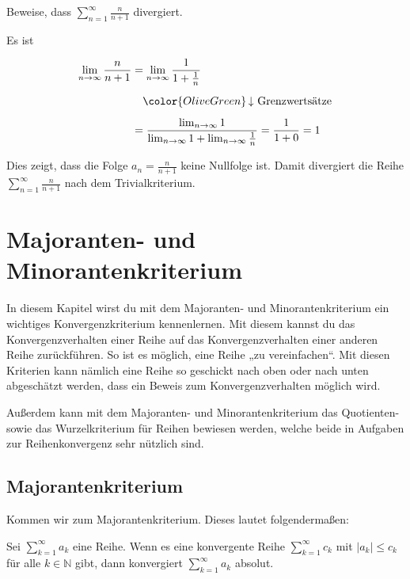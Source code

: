 \documentclass[fontsize=9pt,
               parskip=half-,
               DIV=14,
               listof=chapterentry,
               tocflat]{scrbook}
\begin{document}
\begin{exercise*}
Beweise, dass $\sum _{n=1}^{\infty }{\frac {n}{n+1}}$ divergiert.

\end{exercise*}

\begin{solution*}
Es ist

\begin{align*}
\lim _{n\to \infty }{\frac {n}{n+1}}&=\lim _{n\to \infty }{\frac {1}{1+{\frac {1}{n}}}}\\[0.5em]&\quad {\color {OliveGreen}\left\downarrow \ {\text{Grenzwertsätze}}\right.}\\[0.5em]&={\frac {\lim _{n\to \infty }1}{\lim _{n\to \infty }1+\lim _{n\to \infty }{\frac {1}{n}}}}={\frac {1}{1+0}}=1
\end{align*}

Dies zeigt, dass die Folge $a_{n}={\tfrac {n}{n+1}}$ keine Nullfolge ist. Damit divergiert die Reihe $\sum _{n=1}^{\infty }{\frac {n}{n+1}}$ nach dem Trivialkriterium.

\end{solution*}

\chapter{Majoranten- und Minorantenkriterium}

In diesem Kapitel wirst du mit dem Majoranten- und Minorantenkriterium ein wichtiges Konvergenzkriterium kennenlernen. Mit diesem kannst du das Konvergenzverhalten einer Reihe auf das Konvergenzverhalten einer anderen Reihe zurückführen. So ist es möglich, eine Reihe „zu vereinfachen“. Mit diesen Kriterien kann nämlich eine Reihe so geschickt nach oben oder nach unten abgeschätzt werden, dass ein Beweis zum Konvergenzverhalten möglich wird.

Außerdem kann mit dem Majoranten- und Minorantenkriterium das Quotienten- sowie das Wurzelkriterium für Reihen bewiesen werden, welche beide in Aufgaben zur Reihenkonvergenz sehr nützlich sind.

\section{Majorantenkriterium}

Kommen wir zum Majorantenkriterium. Dieses lautet folgendermaßen:

\begin{theorem*}[Majorantenkriterium]
Sei $\sum _{k=1}^{\infty }a_{k}$ eine Reihe. Wenn es eine konvergente Reihe $\sum _{k=1}^{\infty }c_{k}$ mit $|a_{k}|\leq c_{k}$ für alle $k\in \mathbb {N} $ gibt, dann konvergiert $\sum _{k=1}^{\infty }a_{k}$ absolut.

\end{theorem*}
\end{document}
